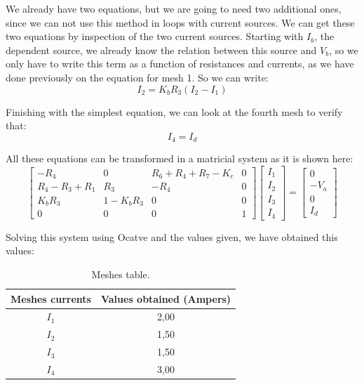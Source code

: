 \noindent We already have two equations, but we are going to need two additional ones, since we can not use this method in loops with current sources. We can get these two equations by inspection of the two current sources. Starting with $I_b$, the dependent source, we already  know the relation between this source and $V_b$, so we only have to write this term as a function of resistances and currents, as we have done previously on the equation for mesh 1. So we can write:
\begin{equation}
I_2 = K_bR_3(I_2-I_1)
  \label{eq:kcl_mesh2}
\end{equation}

\noindent Finishing with the simplest equation, we can look at the fourth mesh to verify that:
\begin{equation}
I_4 = I_d
  \label{eq:kvl_kcl_mesh4}
\end{equation}

\noindent All these equations can be transformed in a matricial system as it is shown here:
$$ \left[ \begin{array}{cccc} -R_4 & 0 & R_6 + R_4 + R_7- K_c  & 0\\
R_4 - R_3 + R_1   & R_3  & - R_4  & 0 \\
K_bR_3 & 1 - K_bR_3 & 0 & 0 \\
 0 & 0 & 0 & 1 \end{array} \right]
\left[ \begin{array}{c} I_1 \\ I_2 \\ I_3 \\ I_4\end{array} \right] = 
\left[ \begin{array}{c} 0 \\ -V_a \\ 0 \\ I_d \end{array} \right] $$

\noindent Solving this system using Ocatve and the values given, we have obtained this values:
\begin{table}[h!]
\centering
\begin{small}
\caption{Meshes table.} \label{Table2}
\begin{tabular}{c|c}
\hline
Meshes currents & Values obtained (Ampers)\\
\hline
$I_1$           & 2,00 \\
$I_2$  & 1,50 \\
$I_3$         & 1,50 \\
$I_4$   & 3,00 \\
\hline
\end{tabular}
\end{small}
\end{table}

